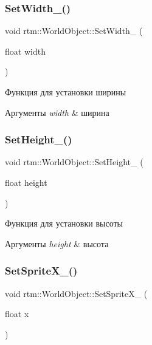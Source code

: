 \subsubsection{\texorpdfstring{Set\+Width\+\_\+()}{SetWidth\_()}}
{\footnotesize\ttfamily void rtm\+::\+World\+Object\+::\+Set\+Width\+\_\+ (\begin{DoxyParamCaption}\item[{float}]{width }\end{DoxyParamCaption})\hspace{0.3cm}{\ttfamily [protected]}}

Функция для установки ширины 
\begin{DoxyParams}{Аргументы}
{\em width} & ширина \\
\hline
\end{DoxyParams}
\mbox{\label{classrtm_1_1_world_object_a60904037c13f9cf151cd28f040ac5f02}} 
\subsubsection{\texorpdfstring{Set\+Height\+\_\+()}{SetHeight\_()}}
{\footnotesize\ttfamily void rtm\+::\+World\+Object\+::\+Set\+Height\+\_\+ (\begin{DoxyParamCaption}\item[{float}]{height }\end{DoxyParamCaption})\hspace{0.3cm}{\ttfamily [protected]}}

Функция для установки высоты 
\begin{DoxyParams}{Аргументы}
{\em height} & высота \\
\hline
\end{DoxyParams}
\mbox{\label{classrtm_1_1_world_object_a57de67f0e2788f0b3226beb2b84a5551}} 
\subsubsection{\texorpdfstring{Set\+Sprite\+X\+\_\+()}{SetSpriteX\_()}}
{\footnotesize\ttfamily void rtm\+::\+World\+Object\+::\+Set\+Sprite\+X\+\_\+ (\begin{DoxyParamCaption}\item[{float}]{x }\end{DoxyParamCaption})\hspace{0.3cm}{\ttfamily [private]}}

